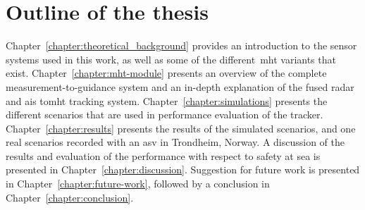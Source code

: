 \section{Outline of the thesis}\label{sec:outline_thesis}
Chapter~\ref{chapter:theoretical_background} provides an introduction to the sensor systems used in this work, as well as some of the different~\gls{mht} variants that exist. Chapter~\ref{chapter:mht-module} presents an overview of the complete measurement-to-guidance system and an in-depth explanation of the fused \gls{radar} and \gls{ais} \gls{tomht} tracking system. Chapter~\ref{chapter:simulations} presents the different scenarios that are used in performance evaluation of the tracker. Chapter~\ref{chapter:results} presents the results of the simulated scenarios, and one real scenarios recorded with an \gls{asv} in Trondheim, Norway. A discussion of the results and evaluation of the performance with respect to safety at sea is presented in Chapter~\ref{chapter:discussion}. Suggestion for future work is presented in Chapter~\ref{chapter:future-work}, followed by a conclusion in Chapter~\ref{chapter:conclusion}.